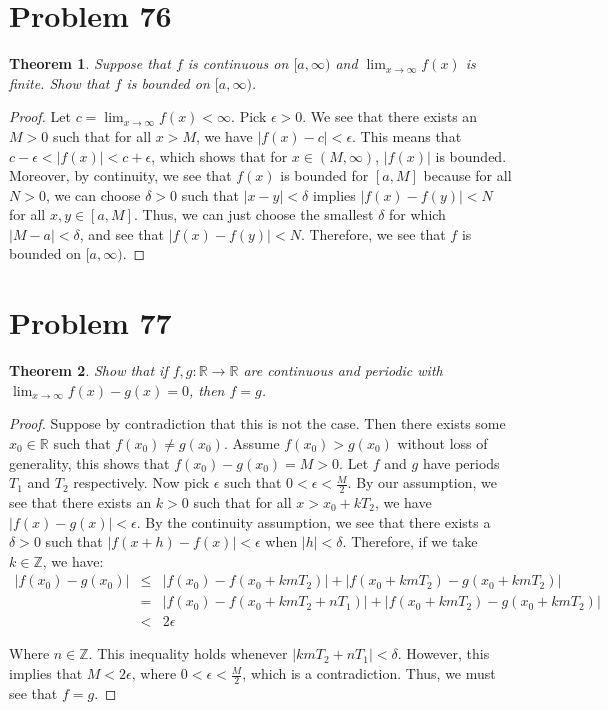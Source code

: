 \documentclass[psamsfonts]{amsart}
\newtheorem{thm}{Theorem}[section]
\theoremstyle{definition}
\theoremstyle{remark}
\numberwithin{equation}{section}
\begin{document}
\section{Problem 76}

\begin{thm}
Suppose that $f$ is continuous on $[a, \infty)$ and $\lim_{x \to \infty} f(x)$ is finite. Show that $f$ is bounded on $[a,\infty)$. 
\end{thm}

\begin{proof}
Let $c = \lim_{x \to \infty} f(x) < \infty$. Pick $\epsilon > 0$. We see that there exists an $M > 0$ such that for all $x > M$, we have $|f(x) - c| < \epsilon$. This means that $c - \epsilon < |f(x)| < c + \epsilon$, which shows that for $x \in (M,\infty)$, $|f(x)|$ is bounded. Moreover, by continuity, we see that $f(x)$ is bounded for $[a,M]$ because for all $N > 0$, we can choose $\delta > 0$ such that $|x - y| < \delta$ implies $|f(x) - f(y)| < N$ for all $x,y \in [a,M]$. Thus, we can just choose the smallest $\delta$ for which $|M - a| < \delta$, and see that $|f(x) - f(y)| < N$. Therefore, we see that $f$ is bounded on $[a,\infty)$. 
\end{proof}

\section{Problem 77}

\begin{thm}
Show that if $f,g: \mathbb{R} \to \mathbb{R}$ are continuous and periodic with $\lim_{x \to \infty} f(x) - g(x) = 0$, then $f =g$. 
\end{thm}

\begin{proof}
Suppose by contradiction that this is not the case. Then there exists some $x_0 \in \mathbb{R}$ such that $f(x_0) \neq g(x_0)$. Assume $f(x_0) > g(x_0)$ without loss of generality, this shows that $f(x_0) - g(x_0) = M > 0$. Let $f$ and $g$ have periods $T_1$ and $T_2$ respectively. Now pick $\epsilon $ such that $0 < \epsilon < \frac{M}{2}$. By our assumption, we see that there exists an $k > 0$ such that for all $x > x_0 + k T_2$, we have $|f(x) - g(x)| < \epsilon$. By the continuity assumption, we see that there exists a $\delta > 0$ such that $|f(x + h) - f(x)| < \epsilon$ when $|h| < \delta$. Therefore, if we take $k \in \mathbb{Z}$, we have:
\begin{eqnarray}
|f(x_0) - g(x_0)| &\leq& |f(x_0) - f(x_0 + k m T_2)| + |f(x_0 + km T_2) - g(x_0 + km T_2)| \\
&=& |f(x_0) - f(x_0 + km T_2 + n T_1)| + |f(x_0 + km T_2) - g(x_0 + km T_2)| \\
&<& 2 \epsilon
\end{eqnarray}

Where $n \in \mathbb{Z}$. This inequality holds whenever $|km T_2 + nT_1| < \delta$. However, this implies that $ M < 2 \epsilon$, where $0 < \epsilon < \frac{M}{2}$, which is a contradiction. Thus, we must see that $f = g$. 
\end{proof}
\end{document}
